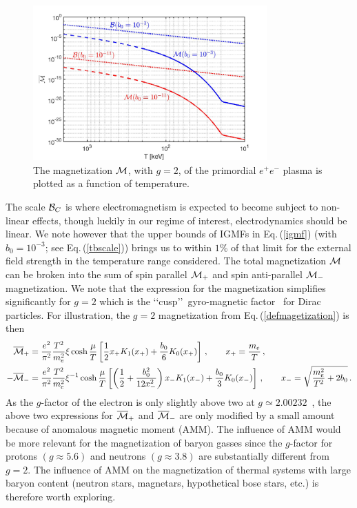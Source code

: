 \documentclass[a4paper]{article}
\newcommand{\req}[1]{Eq.\,(\ref{#1})}
\begin{document}
\begin{figure}[ht]
    \centering
    \includegraphics[width=0.8\textwidth]{Magnetization_Hc_new002.jpg}
    \caption{The magnetization ${\cal M}$, with $g=2$, of the primordial $e^{+}e^{-}$ plasma is plotted as a function of temperature.}
    \label{fig:magnet} 
\end{figure}

The scale ${\cal B}_{C}$ is where electromagnetism is expected to become subject to non-linear effects, though luckily in our regime of interest, electrodynamics should be linear. We note however that the upper bounds of IGMFs in \req{igmf} (with $b_{0}=10^{-3}$; see \req{tbscale}) brings us to within $1\%$ of that limit for the external field strength in the temperature range considered. The total magnetization ${\cal M}$ can be broken into the sum of spin parallel ${\cal M}_{+}$ and spin anti-parallel ${\cal M}_{-}$ magnetization. We note that the expression for the magnetization simplifies significantly for $g=2$ which is the \lq\lq cusp\rq\rq\ gyro-magnetic factor~\cite{rafelski2022study} for Dirac particles. For illustration, the $g=2$ magnetization from \req{defmagetization} is then
\begin{align}
    \label{g2magplus}
    {\overline{\cal M}}_{+}&=\frac{e^{2}}{\pi^{2}}\frac{T^{2}}{m_{e}^{2}}\xi\cosh{\frac{\mu}{T}}\left[\frac{1}{2}x_{+}K_{1}(x_{+})+\frac{b_{0}}{6}K_{0}(x_{+})\right]\,,\qquad x_{+}=\frac{m_{e}}{T}\,,\\
    \label{g2magminus}
    -{\overline{\cal M}}_{-}&=\frac{e^{2}}{\pi^{2}}\frac{T^{2}}{m_{e}^{2}}\xi^{-1}\cosh{\frac{\mu}{T}}\left[\left(\frac{1}{2}+\frac{b_{0}^{2}}{12x_{-}^{2}}\right)x_{-}K_{1}(x_{-})+\frac{b_{0}}{3}K_{0}(x_{-})\right]\,,\qquad x_{-}=\sqrt{\frac{m_{e}^{2}}{T^{2}}+2b_{0}}\,.
\end{align}
As the $g$-factor of the electron is only slightly above two at $g\simeq2.00232$~\cite{tiesinga2021codata}, the above two expressions for ${\overline{\cal M}}_{+}$ and ${\overline{\cal M}}_{-}$ are only modified by a small amount because of anomalous magnetic moment (AMM). The influence of AMM would be more relevant for the magnetization of baryon gasses since the $g$-factor for protons $(g\approx5.6)$ and neutrons $(g\approx3.8)$ are substantially different from $g=2$. The influence of AMM on the magnetization of thermal systems with large baryon content (neutron stars, magnetars, hypothetical bose stars, etc.) is therefore worth exploring.
\end{document}
